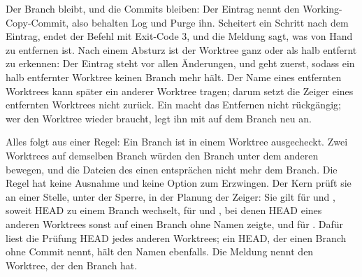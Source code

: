 Der Branch bleibt, und die Commits bleiben: Der Eintrag nennt den Working-Copy-Commit, also
behalten Log und Purge ihn. Scheitert ein Schritt nach dem Eintrag, endet der Befehl mit
Exit-Code 3, und die Meldung sagt, was von Hand zu entfernen ist. Nach einem Absturz ist der
Worktree ganz oder als halb entfernt zu erkennen: Der Eintrag steht vor allen Änderungen, und
 geht zuerst, sodass ein halb entfernter Worktree keinen Branch mehr hält.
Der Name eines entfernten Worktrees kann später ein anderer Worktree tragen; darum setzt
 die Zeiger eines entfernten Worktrees nicht zurück.
Ein  macht das Entfernen nicht rückgängig;
wer den Worktree wieder braucht, legt ihn mit  auf dem Branch neu an.

Alles folgt aus einer Regel: Ein Branch ist in einem Worktree ausgecheckt.
Zwei Worktrees auf demselben Branch würden den Branch unter dem anderen bewegen, und die Dateien
des einen entsprächen nicht mehr dem Branch. Die Regel hat keine Ausnahme und keine Option zum
Erzwingen. Der Kern prüft sie an einer Stelle, unter der Sperre, in der Planung der Zeiger: Sie
gilt für  und , soweit HEAD zu einem Branch wechselt, für
 und , bei denen HEAD eines anderen Worktrees sonst auf einen
Branch ohne Namen zeigte, und für . Dafür liest die Prüfung HEAD jedes anderen
Worktrees; ein HEAD, der einen Branch ohne Commit nennt, hält den Namen ebenfalls.
Die Meldung nennt den Worktree, der den Branch hat.

